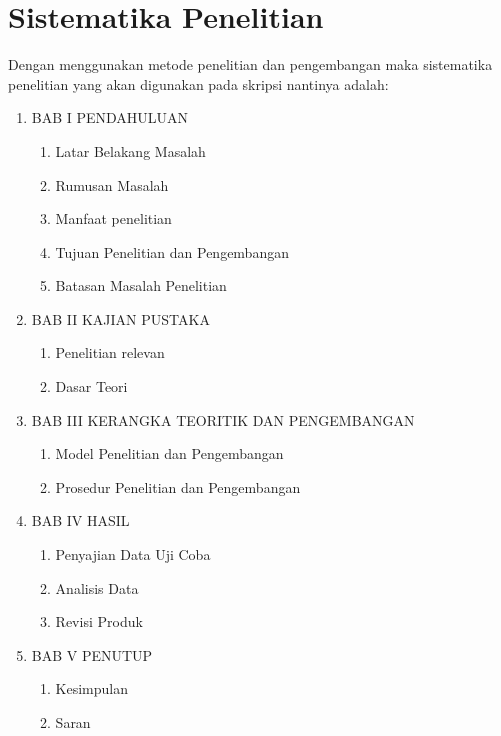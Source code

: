 \section{Sistematika Penelitian}

Dengan menggunakan metode penelitian dan pengembangan maka sistematika penelitian yang akan digunakan pada skripsi nantinya adalah:

\begin{enumerate}[label=]

	\item BAB I PENDAHULUAN 
	\begin{enumerate}[label=\Alph*.]
		\item Latar Belakang Masalah
		\item Rumusan Masalah
		\item Manfaat penelitian
		\item Tujuan Penelitian dan Pengembangan
		\item Batasan Masalah Penelitian
	\end{enumerate}

	\item BAB II KAJIAN PUSTAKA 
	\begin{enumerate}[label=\Alph*.]
		\item Penelitian relevan
		\item Dasar Teori
	\end{enumerate}

	\item BAB III KERANGKA TEORITIK DAN PENGEMBANGAN 
	\begin{enumerate}[label=\Alph*.]
		\item Model Penelitian dan Pengembangan
		\item Prosedur Penelitian dan Pengembangan
	\end{enumerate}

	\item BAB IV HASIL 
	\begin{enumerate}[label=\Alph*.]
		\item Penyajian Data Uji Coba
		\item Analisis Data
		\item Revisi Produk
	\end{enumerate}

	\item BAB V PENUTUP 
	\begin{enumerate}[label=\Alph*.]
		\item Kesimpulan
		\item Saran
	\end{enumerate}

\end{enumerate}


